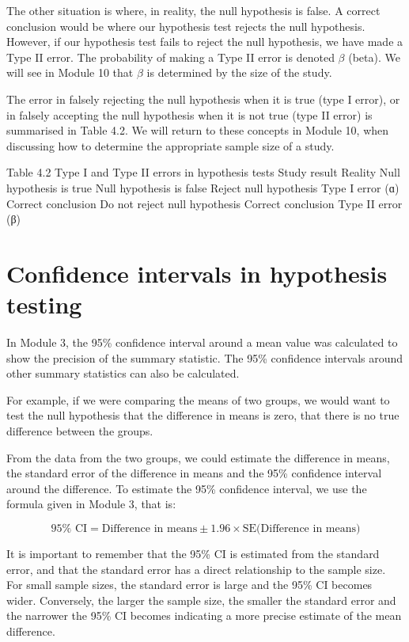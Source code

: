 \documentclass[
]{memoir}
\begin{document}
The other situation is where, in reality, the null hypothesis is false. A correct conclusion would be where our hypothesis test rejects the null hypothesis. However, if our hypothesis test fails to reject the null hypothesis, we have made a Type II error. The probability of making a Type II error is denoted \(\beta\) (beta). We will see in Module 10 that \(\beta\) is determined by the size of the study.

The error in falsely rejecting the null hypothesis when it is true (type I error), or in falsely accepting the null hypothesis when it is not true (type II error) is summarised in Table 4.2. We will return to these concepts in Module 10, when discussing how to determine the appropriate sample size of a study.

Table 4.2 Type I and Type II errors in hypothesis tests
Study result Reality
Null hypothesis is true Null hypothesis is false
Reject null hypothesis Type I error (ɑ) Correct conclusion
Do not reject null hypothesis Correct conclusion Type II error (β)

\hypertarget{confidence-intervals-in-hypothesis-testing}{%
\section{Confidence intervals in hypothesis testing}\label{confidence-intervals-in-hypothesis-testing}}

In Module 3, the 95\% confidence interval around a mean value was calculated to show the precision of the summary statistic. The 95\% confidence intervals around other summary statistics can also be calculated.

For example, if we were comparing the means of two groups, we would want to test the null hypothesis that the difference in means is zero, that there is no true difference between the groups.

From the data from the two groups, we could estimate the difference in means, the standard error of the difference in means and the 95\% confidence interval around the difference. To estimate the 95\% confidence interval, we use the formula given in Module 3, that is:

\[ 95\% \text{ CI} = \text{Difference in means} \pm 1.96 \times \text{SE}(\text{Difference in means)} \]

It is important to remember that the 95\% CI is estimated from the standard error, and that the standard error has a direct relationship to the sample size. For small sample sizes, the standard error is large and the 95\% CI becomes wider. Conversely, the larger the sample size, the smaller the standard error and the narrower the 95\% CI becomes indicating a more precise estimate of the mean difference.
\end{document}
